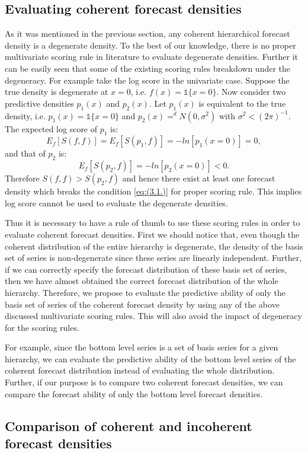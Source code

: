 \documentclass[a4paper, 11pt]{article}
\begin{document}
\subsection{Evaluating coherent forecast densities}

As it was mentioned in the previous section, any coherent hierarchical forecast density is a degenerate density. To the best of our knowledge, there is no proper multivariate scoring rule in literature to evaluate degenerate densities. Further it can be easily seen that some of the existing scoring rules breakdown under the degeneracy. For example take the log score in the univariate case. Suppose the true density is degenerate at $x=0$, i.e. $f(x)=\mathbb{1}\{x=0\}$.  Now consider two predictive densities $p_1(x)$ and $p_2(x)$. Let $p_1(x)$ is equivalent to the true density, i.e. $p_1(x)=\mathbb{1}\{x=0\}$ and $p_2(x) =^d N(0,\sigma^2)$ with $\sigma^2 < (2\pi)^{-1}$. The expected log score of $p_1$ is:
$$
  E_f[S(f,f)] = E_f[S(p_1,f)] = -ln[p_1(x=0)]=0,
$$
and that of $p_2$ is:
$$
  E_f[S(p_2,f)] = -ln[p_2(x=0)]<0.
$$
Therefore $S(f,f) > S(p_2,f)$ and hence there exist at least one forecast density which breaks the condition \eqref{eq:(3.1.)} for proper scoring rule. This implies log score cannot be used to evaluate the degenerate densities.

Thus it is necessary to have a rule of thumb to use these scoring rules in order to evaluate coherent forecast densities. First we should notice that, even though the coherent distribution of the entire hierarchy is degenerate, the density of the basis set of series is non-degenerate since these series are linearly independent. Further, if we can correctly specify the forecast distribution of these basis set of series, then we have almost obtained the correct forecast distribution of the whole hierarchy. Therefore, we propose to evaluate the predictive ability of only the basis set of series of the coherent forecast density by using any of the above discussed multivariate scoring rules. This will also avoid the impact of degeneracy for the scoring rules.

For example, since the bottom level series is a set of basis series for a given hierarchy, we can evaluate the predictive ability of the bottom level series of the coherent forecast distribution instead of evaluating the whole distribution. Further, if our purpose is to compare two coherent forecast densities, we can compare the forecast ability of only the bottom level forecast densities.

\subsection{Comparison of coherent and incoherent forecast densities}
\end{document}
